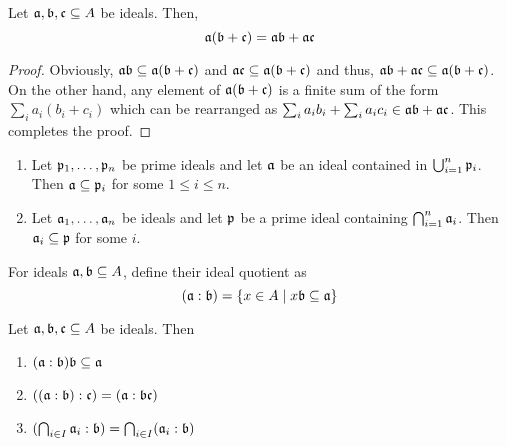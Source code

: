 \begin{proposition}
    Let $\mathfrak a,\mathfrak b,\mathfrak c\subseteq A$ be ideals. Then, 
    \begin{equation*}
        \mathfrak a(\mathfrak b + \mathfrak c) = \mathfrak a\mathfrak b + \mathfrak a\mathfrak c
    \end{equation*}
\end{proposition}
\begin{proof}
    Obviously, $\mathfrak a\mathfrak b\subseteq\mathfrak a(\mathfrak b + \mathfrak c)$ and $\mathfrak a\mathfrak c\subseteq\mathfrak a(\mathfrak b + \mathfrak c)$ and thus, $\mathfrak a\mathfrak b + \mathfrak a\mathfrak c\subseteq\mathfrak a(\mathfrak b + \mathfrak c)$. On the other hand, any element of $\mathfrak a(\mathfrak b + \mathfrak c)$ is a finite sum of the form $\sum_{i} a_i(b_i + c_i)$ which can be rearranged as $\sum_{i} a_ib_i + \sum_{i}a_ic_i\in\mathfrak a\mathfrak b + \mathfrak a\mathfrak c$. This completes the proof.
\end{proof}

\begin{proposition}
    \begin{enumerate}[label=(\alph*)]
    \item Let $\mathfrak p_1,\ldots,\mathfrak p_n$ be prime ideals and let $\mathfrak a$ be an ideal contained in $\bigcup_{i = 1}^n\mathfrak p_i$. Then $\mathfrak a\subseteq\mathfrak p_i$ for some $1\le i\le n$.
    \item Let $\mathfrak a_1,\ldots,\mathfrak a_n$ be ideals and let $\mathfrak p$ be a prime ideal containing $\bigcap_{i = 1}^n\mathfrak a_i$. Then $\mathfrak a_i\subseteq\mathfrak p$ for some $i$.
    \end{enumerate}
\end{proposition}

For ideals $\mathfrak a,\mathfrak b\subseteq A$, define their ideal quotient as 
\begin{equation*}
    (\mathfrak a:\mathfrak b) = \{x\in A\mid x\mathfrak b\subseteq\mathfrak a\}
\end{equation*}

\begin{proposition}
    Let $\mathfrak a,\mathfrak b,\mathfrak c\subseteq A$ be ideals. Then 
    \begin{enumerate}
        \item $(\mathfrak a:\mathfrak b)\mathfrak b\subseteq\mathfrak a$
        \item $((\mathfrak a:\mathfrak b):\mathfrak c) = (\mathfrak a:\mathfrak b\mathfrak c)$
        \item $(\bigcap_{i\in I}\mathfrak a_i:\mathfrak b) = \bigcap_{i\in I}(\mathfrak a_i:\mathfrak b)$
    \end{enumerate}
\end{proposition}

